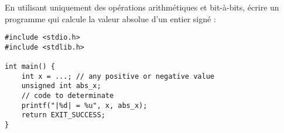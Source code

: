 \documentclass[../../../main.tex]{subfiles}
\begin{document}
En utilisant uniquement des opérations arithmétiques et bit-à-bits, écrire un programme qui calcule la valeur absolue d'un entier signé :
\begin{verbatim}
#include <stdio.h>
#include <stdlib.h>

int main() {
	int x = ...; // any positive or negative value
	unsigned int abs_x;
	// code to determinate
	printf("|%d| = %u", x, abs_x);
	return EXIT_SUCCESS;
}
\end{verbatim}
\end{document}
